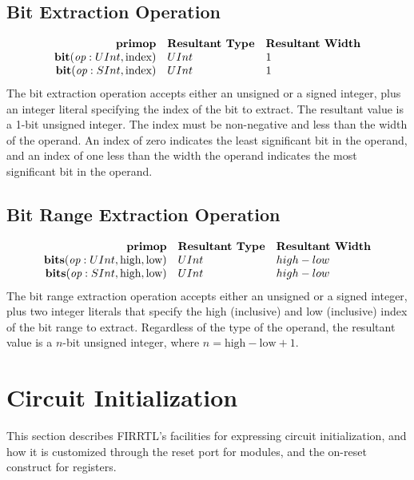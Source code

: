 \documentclass[12pt]{article}
\begin{document}
\subsection{Bit Extraction Operation}
\[
\begin{array}{rll}
\text{\bf primop} & \text{\bf Resultant Type} & \text{\bf Resultant Width} \\
\text{\bf bit}(\text{\em op}:UInt, \text{index})  & UInt & 1    \\
\text{\bf bit}(\text{\em op}:SInt, \text{index})  & UInt & 1    \\
\end{array}
\]
The bit extraction operation accepts either an unsigned or a signed integer, plus an integer literal specifying the index of the bit to extract.
The resultant value is a 1-bit unsigned integer.
The index must be non-negative and less than the width of the operand.
An index of zero indicates the least significant bit in the operand, and an index of one less than the width the operand indicates the most significant bit in the operand.

\subsection{Bit Range Extraction Operation}
\[
\begin{array}{rll}
\text{\bf primop} & \text{\bf Resultant Type} & \text{\bf Resultant Width} \\
\text{\bf bits}(\text{\em op}:UInt, \text{high}, \text{low})  & UInt & high - low    \\
\text{\bf bits}(\text{\em op}:SInt, \text{high}, \text{low})  & UInt & high - low    \\
\end{array}
\]
The bit range extraction operation accepts either an unsigned or a signed integer, plus two integer literals that specify the high (inclusive) and low (inclusive) index of the bit range to extract.
Regardless of the type of the operand, the resultant value is a $n$-bit unsigned integer, where $n = \text{high} - \text{low} + 1$. 

\section{Circuit Initialization} \label{initialization}

This section describes FIRRTL's facilities for expressing circuit initialization, and how it is customized through the reset port for modules, and the on-reset construct for registers.
\end{document}
